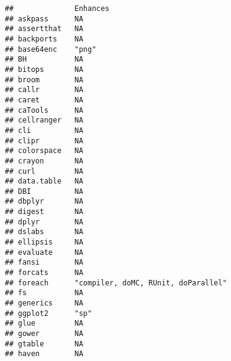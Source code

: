 \documentclass[]{article}
\begin{document}
\begin{verbatim}
##              Enhances                                                  
## askpass      NA                                                        
## assertthat   NA                                                        
## backports    NA                                                        
## base64enc    "png"                                                     
## BH           NA                                                        
## bitops       NA                                                        
## broom        NA                                                        
## callr        NA                                                        
## caret        NA                                                        
## caTools      NA                                                        
## cellranger   NA                                                        
## cli          NA                                                        
## clipr        NA                                                        
## colorspace   NA                                                        
## crayon       NA                                                        
## curl         NA                                                        
## data.table   NA                                                        
## DBI          NA                                                        
## dbplyr       NA                                                        
## digest       NA                                                        
## dplyr        NA                                                        
## dslabs       NA                                                        
## ellipsis     NA                                                        
## evaluate     NA                                                        
## fansi        NA                                                        
## forcats      NA                                                        
## foreach      "compiler, doMC, RUnit, doParallel"                       
## fs           NA                                                        
## generics     NA                                                        
## ggplot2      "sp"                                                      
## glue         NA                                                        
## gower        NA                                                        
## gtable       NA                                                        
## haven        NA                                                        

\end{verbatim}
\end{document}
